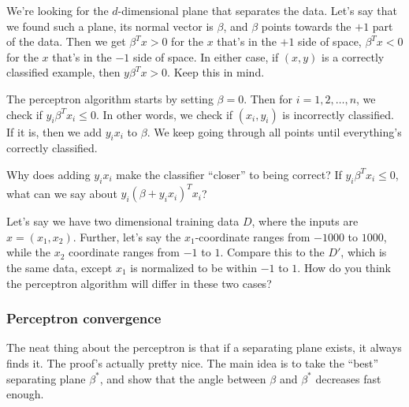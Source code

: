 \documentclass[11pt,paper=letter]{scrartcl}
\begin{document}
We're looking for the $d$-dimensional plane that separates the data. Let's say that we found such a plane, its normal vector is $\beta$, and $\beta$ points towards the $+1$ part of the data. Then we get $\beta^Tx > 0$ for the $x$ that's in the $+1$ side of space, $\beta^Tx < 0$ for the $x$ that's in the $-1$ side of space. In either case, if $(x, y)$ is a correctly classified example, then $y\beta^Tx > 0$. Keep this in mind.

The perceptron algorithm starts by setting $\beta = 0$. Then for $i = 1, 2, \ldots, n$, we check if $y_i\beta^Tx_i \le 0$. In other words, we check if $(x_i, y_i)$ is incorrectly classified. If it is, then we add $y_ix_i$ to $\beta$. We keep going through all points until everything's correctly classified.

\begin{exrboxed}
  Why does adding $y_ix_i$ make the classifier ``closer'' to being correct? If $y_i\beta^Tx_i \le 0$, what can we say about $y_i\left(\beta + y_ix_i\right)^Tx_i$?
\end{exrboxed}
\vspace{-1em}
\begin{exrboxed}
  Let's say we have two dimensional training data $D$, where the inputs are $x =(x_1, x_2)$. Further, let's say the $x_1$-coordinate ranges from $-1000$ to $1000$, while the $x_2$ coordinate ranges from $-1$ to $1$. Compare this to the $D'$, which is the same data, except $x_1$ is normalized to be within $-1$ to $1$. How do you think the perceptron algorithm will differ in these two cases?
\end{exrboxed}

\subsubsection*{Perceptron convergence}

The neat thing about the perceptron is that if a separating plane exists, it always finds it. The proof's actually pretty nice. The main idea is to take the ``best'' separating plane $\beta^*$, and show that the angle between $\beta$ and $\beta^*$ decreases fast enough.
\end{document}
